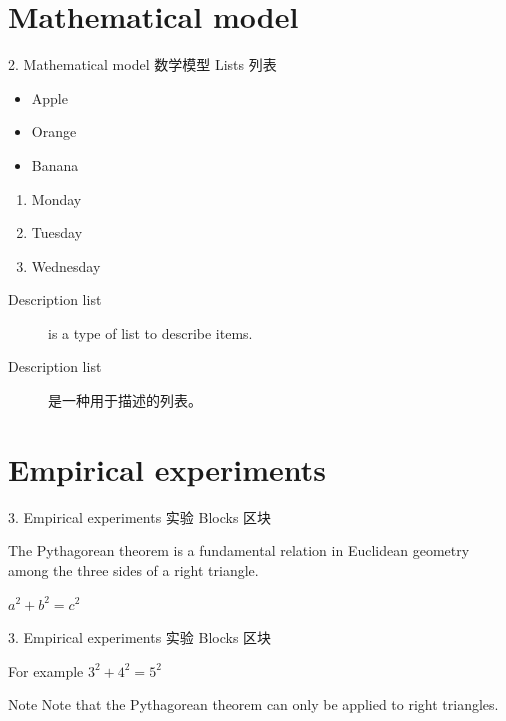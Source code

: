 \documentclass{ctexbeamer}
\begin{document}
  \section{Mathematical model}
  \label{Sec:model}
  \begin{frame}{2. Mathematical model 数学模型}
      Lists 列表

      \begin{itemize}
          \item Apple
          \item Orange
          \item Banana
      \end{itemize}

      \begin{enumerate}
          \item Monday
          \item Tuesday
          \item Wednesday
      \end{enumerate}

      \begin{description}
          \item[Description list] is a type of list to describe items.
          \item[Description list] 是一种用于描述的列表。
      \end{description}
  \end{frame} %

  \section{Empirical experiments}
  \label{Sec:experiments}
  \begin{frame}{3. Empirical experiments 实验}
      Blocks 区块

      \begin{definition}
          The Pythagorean theorem is a fundamental relation in Euclidean geometry among the three sides of a right triangle.
      \end{definition}

      \begin{theorem}
          $a^2 + b^2 = c^2$
      \end{theorem}
  \end{frame} %

  \begin{frame}{3. Empirical experiments 实验}
      Blocks 区块

      \begin{exampleblock}{For example}
          $3^2 + 4^2 = 5^2$
      \end{exampleblock}

      \begin{alertblock}{Note}
          Note that the Pythagorean theorem can only be applied to right triangles.
      \end{alertblock}
  \end{frame} %
\end{document}
